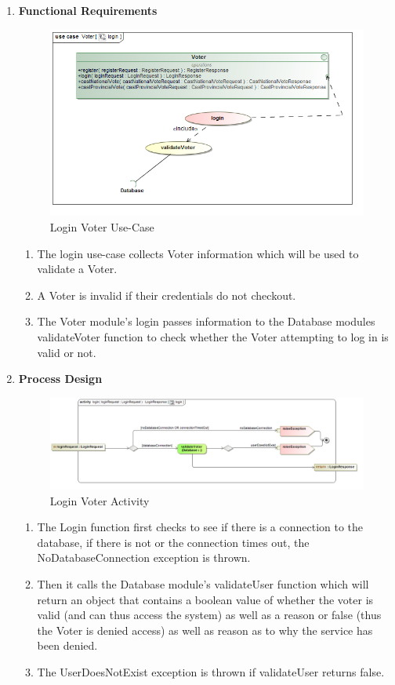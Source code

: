 \begin{enumerate}
\begin{enumerate}
			\item \textbf{Functional Requirements}
			\begin{figure}[H]
				\centering
				\includegraphics[width=0.75\linewidth]{../Images/Voter/UseCases/login_useCase.png}
				\caption{Login Voter Use-Case}
			\end{figure}
			
			\begin{enumerate}
				\item The login use-case collects Voter information which will be used to validate a Voter. 
				\item A Voter is invalid if their credentials do not checkout. 
				\item The Voter module's login passes information to the Database modules validateVoter function to check whether the Voter attempting to log in is valid or not.  
			\end{enumerate}
			
		
			
			\item \textbf{Process Design}
			\begin{figure}[H]
				\centering
				\includegraphics[width=0.75\linewidth]{../Images/Voter/ActivityDiagrams/login_activity.png}
				\caption{Login Voter Activity}
			\end{figure}
			
			
			\begin{enumerate}
				\item The Login function first checks to see if there is a connection to the database, if there is not or the connection times out, the NoDatabaseConnection exception is thrown.
				\item Then it calls the Database module's validateUser function which will return an object that contains a boolean value of whether the voter is valid (and can thus access the system) as well as a reason or false (thus the Voter is denied access) as well as reason as to why the service has been denied. 
				\item The UserDoesNotExist exception is thrown if validateUser returns false. 
			\end{enumerate}			
		\end{enumerate}
\end{enumerate}



